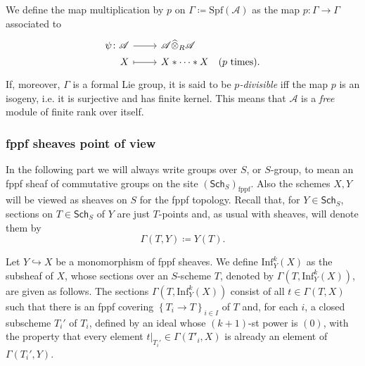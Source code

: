 \documentclass[../Main]{subfiles}
\begin{document}
\begin{defn}\label{defn:pDivisibleFormalLieGroup}
	We define the map multiplication by $p$ on $\Gamma \coloneqq \mathrm{Spf}(\mathscr{A})$
	as the map $p\colon \Gamma \to \Gamma$
	associated to 
	\begin{equation*}
	\begin{tikzcd}[row sep = 0ex
		,/tikz/column 1/.append style={anchor=base east}
		,/tikz/column 2/.append style={anchor=base west}]
		\psi\colon \mathscr{A} \arrow[r, "", rightarrow] &
		\mathscr{A} \widehat{\otimes}_R \mathscr{A} \\
		X \arrow[r, "", mapsto] & 
		X \ast \cdots \ast X
	\quad \text{($p$ times)}
	.\end{tikzcd}
	\end{equation*} 
	If, moreover, $\Gamma$ is a formal Lie group, 
	it is said to be {\em $p$-divisible} iff the map $p$ is 
	an isogeny, i.e. it is surjective and has finite kernel.
	This means that $\mathscr{A}$ is a {\em free} module of finite rank over itself.
\end{defn}



\subsubsection{fppf sheaves point of view}
In the following part we will always write groups over $S$, or $S$-group, to mean
an fppf sheaf of commutative groups on the site $(\mathsf{Sch}_{ S })_{\mathrm{fppf}}$.
Also the schemes $X, Y$ will be viewed as sheaves on $S$
for the fppf topology.
Recall that, for $Y \in \mathsf{Sch}_{ S }$, sections on
$T \in \mathsf{Sch}_{ S }$ of $Y$ are just $T$-points and,
as usual with sheaves, will denote them by
\begin{equation*}
	\Gamma \left( T, Y \right) \coloneqq Y(T)
.\end{equation*}


\begin{defn}\label{defn:kInfNeighbourhood}
	Let $Y \hookrightarrow X$ be a monomorphism of fppf sheaves.
	We define $\mathrm{Inf}_Y^k(X)$ as the subsheaf of $X$,
	whose sections over an $S$-scheme $T$, denoted by $\Gamma ( T , \mathrm{Inf}_Y^k(X) )$,
	are given as follows.
	The sections $\Gamma ( T , \mathrm{Inf}_Y^k(X) )$ consist of all
	$t \in \Gamma \left( T, X \right)$ such that
	there is an fppf covering $\left\{ T_{ i } \to T \right\}_{ i \in I }$
	of $T$ and, for each $i$, a closed subscheme $T_i'$ of $T_i$,
	defined by an ideal whose $(k+1)$-st power is $(0)$,
	with the property that every element $\left.t\right|_{T_i'} \in \Gamma(T'_i, X)$
	is already an element of $\Gamma(T_i', Y)$.
\end{defn}
\end{document}
